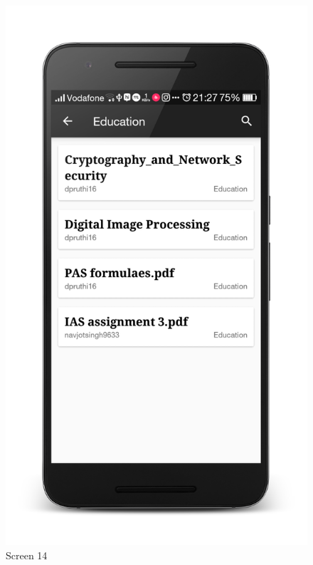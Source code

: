 \begin{figure}[ht]
\centering
\includegraphics[scale=0.13]{images/d6.png}
\caption{Screen 14}
\end{figure}

